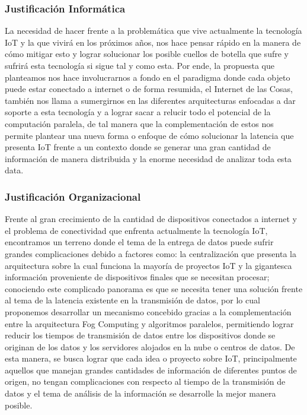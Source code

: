         \subsubsection{Justificación Informática}
            La necesidad de hacer frente a la problemática que vive actualmente la tecnología IoT y la que vivirá en los próximos años, nos hace pensar rápido en la manera de cómo mitigar esto y lograr solucionar los posible cuellos de botella que sufre y sufrirá esta tecnología si sigue tal y como esta. Por ende, la propuesta que planteamos nos hace involucrarnos a fondo en el paradigma donde cada objeto puede estar conectado a internet o de forma resumida, el Internet de las Cosas, también nos llama a sumergirnos en las diferentes arquitecturas enfocadas a dar soporte a esta tecnología y a lograr sacar a relucir todo el potencial de la computación paralela, de tal manera que la complementación de estos nos permite plantear una nueva forma o enfoque de cómo solucionar la latencia que presenta IoT frente a un contexto donde se generar una gran cantidad de información de manera distribuida y la enorme necesidad de analizar toda esta data.
        \subsubsection{Justificación Organizacional}
            Frente al gran crecimiento de la cantidad de dispositivos conectados a internet y el problema de conectividad que enfrenta actualmente la tecnología IoT, encontramos un terreno donde el tema de la entrega de datos puede sufrir grandes complicaciones debido a factores como: la centralización que presenta la arquitectura sobre la cual funciona la mayoría de proyectos IoT y la gigantesca información proveniente de dispositivos finales que se necesitan procesar; conociendo este complicado panorama es que se necesita tener una solución frente al tema de la latencia existente en la transmisión de datos, por lo cual proponemos desarrollar un mecanismo concebido gracias a la complementación entre la arquitectura Fog Computing y algoritmos paralelos, permitiendo lograr reducir los tiempos de transmisión de datos entre los dispositivos donde se originan de los datos y los servidores alojados en la nube o centros de datos. De esta manera, se busca lograr que cada idea o proyecto sobre IoT, principalmente aquellos que manejan grandes cantidades de información de diferentes puntos de origen, no tengan complicaciones con respecto al tiempo de la transmisión de datos y el tema de análisis de la información se desarrolle la mejor manera posible.
